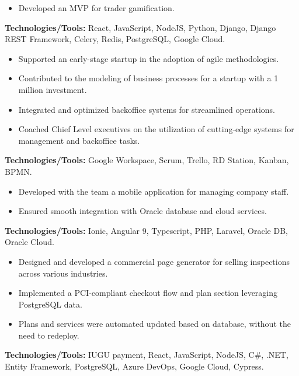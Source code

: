 \documentclass[10pt,a4paper]{altacv}
\begin{document}
\begin{itemize}
    \setlength{\itemindent}{0.5em}
    \item[--] Developed an MVP for trader gamification.
\end{itemize}
\textbf{Technologies/Tools:} React, JavaScript, NodeJS, Python, Django, Django REST Framework, Celery, Redis, PostgreSQL, Google Cloud.
\vspace{5mm}

\begin{itemize}
    \setlength{\itemindent}{0.5em}
    \item[--] Supported an early-stage startup in the adoption of agile methodologies.
    \item[--] Contributed to the modeling of business processes for a startup with a 1 million investment.
    \item[--] Integrated and optimized backoffice systems for streamlined operations.
    \item[--] Coached Chief Level executives on the utilization of cutting-edge systems for management and backoffice tasks.
\end{itemize}
\textbf{Technologies/Tools:} Google Workspace, Scrum, Trello, RD Station, Kanban, BPMN.
\vspace{5mm}

\begin{itemize}
    \setlength{\itemindent}{0.5em}
    \item[--] Developed with the team a mobile application for managing company staff.
    \item[--] Ensured smooth integration with Oracle database and cloud services.
\end{itemize}
\textbf{Technologies/Tools:} Ionic, Angular 9, Typescript, PHP, Laravel, Oracle DB, Oracle Cloud.
\vspace{5mm}

\begin{itemize}
    \setlength{\itemindent}{0.5em}
    \item[--] Designed and developed a commercial page generator for selling inspections across various industries.
    \item[--] Implemented a PCI-compliant checkout flow and plan section leveraging PostgreSQL data.
    \item[--] Plans and services were automated updated based on database, without the need to redeploy.
\end{itemize}
\textbf{Technologies/Tools:} IUGU payment, React, JavaScript, NodeJS, C\#, .NET, Entity Framework, PostgreSQL, Azure DevOps, Google Cloud, Cypress.
\end{document}
